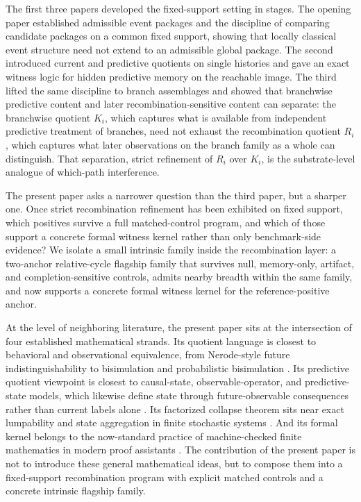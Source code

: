 \documentclass[11pt]{article}
\theoremstyle{definition}
\begin{document}
The first three papers developed the fixed-support setting in stages. The opening paper established admissible event packages and the discipline of comparing candidate packages on a common fixed support, showing that locally classical event structure need not extend to an admissible global package. The second introduced current and predictive quotients on single histories and gave an exact witness logic for hidden predictive memory on the reachable image. The third lifted the same discipline to branch assemblages and showed that branchwise predictive content and later recombination-sensitive content can separate: the branchwise quotient $K_i$, which captures what is available from independent predictive treatment of branches, need not exhaust the recombination quotient $R_i$, which captures what later observations on the branch family as a whole can distinguish. That separation, strict refinement of $R_i$ over $K_i$, is the substrate-level analogue of which-path interference. \cite{Tsiokos2026LocallyBoolean,Tsiokos2026HolonomyMemory,Tsiokos2026MarkingErasureRecombination}

The present paper asks a narrower question than the third paper, but a sharper one. Once strict recombination refinement has been exhibited on fixed support, which positives survive a full matched-control program, and which of those support a concrete formal witness kernel rather than only benchmark-side evidence? We isolate a small intrinsic family inside the recombination layer: a two-anchor relative-cycle flagship family that survives null, memory-only, artifact, and completion-sensitive controls, admits nearby breadth within the same family, and now supports a concrete formal witness kernel for the reference-positive anchor.

At the level of neighboring literature, the present paper sits at the intersection of four established mathematical strands. Its quotient language is closest to behavioral and observational equivalence, from Nerode-style future indistinguishability to bisimulation and probabilistic bisimulation \cite{Nerode1958,Park1981,Milner1980,LarsenSkou1991,Sangiorgi2011,vanGlabbeek2001}. Its predictive quotient viewpoint is closest to causal-state, observable-operator, and predictive-state models, which likewise define state through future-observable consequences rather than current labels alone \cite{CrutchfieldYoung1989,ShaliziCrutchfield2001,Jaeger2000,LittmanSuttonSingh2001}. Its factorized collapse theorem sits near exact lumpability and state aggregation in finite stochastic systems \cite{KemenySnell1976,Buchholz1994,GivanDeanGreig2003,LiWalshLittman2006}. And its formal kernel belongs to the now-standard practice of machine-checked finite mathematics in modern proof assistants \cite{deMouraUllrich2021,MathlibCommunity2020,Gonthier2008,Paulson2015,LiuHasanTahar2011}. The contribution of the present paper is not to introduce these general mathematical ideas, but to compose them into a fixed-support recombination program with explicit matched controls and a concrete intrinsic flagship family.
\end{document}
